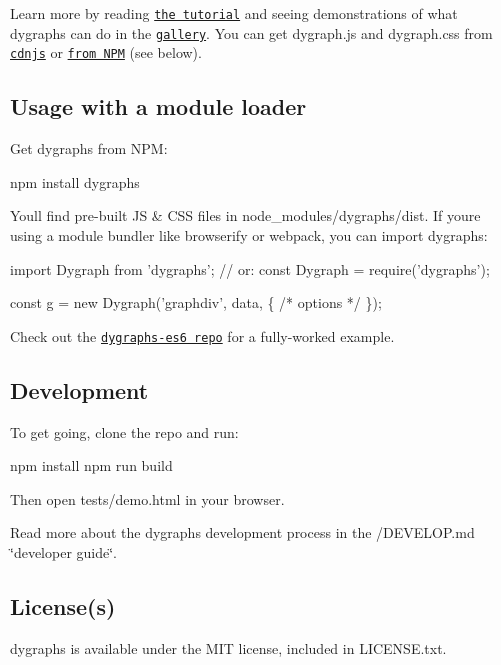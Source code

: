 Learn more by reading \href{http://www.dygraphs.com/tutorial.html}{\tt the tutorial} and seeing demonstrations of what dygraphs can do in the \href{http://www.dygraphs.com/gallery}{\tt gallery}. You can get {\ttfamily dygraph.\+js} and {\ttfamily dygraph.\+css} from \href{https://cdnjs.com/libraries/dygraph}{\tt cdnjs} or \href{https://www.npmjs.com/package/dygraphs}{\tt from N\+PM} (see below).\hypertarget{md_src_website_node_modules_dygraphs_README_autotoc_md21}{}\subsection{Usage with a module loader}\label{md_src_website_node_modules_dygraphs_README_autotoc_md21}
Get dygraphs from N\+PM\+: \begin{DoxyVerb}npm install dygraphs
\end{DoxyVerb}


You\textquotesingle{}ll find pre-\/built JS \& C\+SS files in {\ttfamily node\+\_\+modules/dygraphs/dist}. If you\textquotesingle{}re using a module bundler like browserify or webpack, you can import dygraphs\+:


\begin{DoxyCode}
import Dygraph from 'dygraphs';
// or: const Dygraph = require('dygraphs');

const g = new Dygraph('graphdiv', data, \{ /* options */ \});
\end{DoxyCode}


Check out the \href{https://github.com/danvk/dygraphs-es6}{\tt dygraphs-\/es6 repo} for a fully-\/worked example.\hypertarget{md_src_website_node_modules_dygraphs_README_autotoc_md22}{}\subsection{Development}\label{md_src_website_node_modules_dygraphs_README_autotoc_md22}
To get going, clone the repo and run\+: \begin{DoxyVerb}npm install
npm run build
\end{DoxyVerb}


Then open {\ttfamily tests/demo.\+html} in your browser.

Read more about the dygraphs development process in the /\+D\+E\+V\+E\+L\+OP.md \char`\"{}developer guide\char`\"{}.\hypertarget{md_src_website_node_modules_dygraphs_README_autotoc_md23}{}\subsection{License(s)}\label{md_src_website_node_modules_dygraphs_README_autotoc_md23}
dygraphs is available under the M\+IT license, included in L\+I\+C\+E\+N\+S\+E.\+txt. 